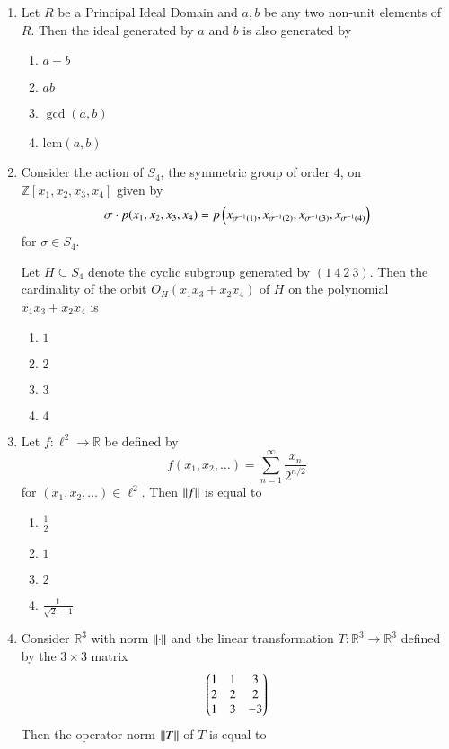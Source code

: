 \documentclass[journal,12pt,onecolumn]{IEEEtran}
\theoremstyle{remark}
\begin{document}
\begin{enumerate}
\item Let $R$ be a Principal Ideal Domain and $a,b$ be any two non-unit elements of $R$. Then the ideal generated by $a$ and $b$ is also generated by
\\[-0.3em]\makebox[\textwidth][r]{\textit{[GATE EE 2025]}}

\begin{enumerate}[label=(\Alph*)]
\item $a + b$
\item $ab$
\item $\gcd(a,b)$
\item $\mathrm{lcm}(a,b)$
\end{enumerate}

\item Consider the action of $S_4$, the symmetric group of order $4$, on $\mathbb{Z}[x_1,x_2,x_3,x_4]$ given by
\[
\sigma \cdot p(x_1,x_2,x_3,x_4) = p\left(x_{\sigma^{-1}(1)}, x_{\sigma^{-1}(2)}, x_{\sigma^{-1}(3)}, x_{\sigma^{-1}(4)}\right)
\]
for $\sigma \in S_4$.  

Let $H \subseteq S_4$ denote the cyclic subgroup generated by $(1\ 4\ 2\ 3)$. Then the cardinality of the orbit  
$O_H(x_1x_3 + x_2x_4)$ of $H$ on the polynomial $x_1x_3 + x_2x_4$ is
\\[-0.3em]\makebox[\textwidth][r]{\textit{[GATE EE 2025]}}

\begin{enumerate}[label=(\Alph*)]
\item $1$
\item $2$
\item $3$
\item $4$
\end{enumerate}

\item Let $f:\ell^2 \to \mathbb{R}$ be defined by
\[
f(x_1,x_2,\dots) = \sum_{n=1}^\infty \frac{x_n}{2^{n/2}}
\]
for $(x_1,x_2,\dots) \in \ell^2$. Then $\left\lVert f\right\rVert$ is equal to
\\[-0.3em]\makebox[\textwidth][r]{\textit{[GATE EE 2025]}}

\begin{enumerate}[label=(\Alph*)]
\item $\frac{1}{2}$
\item $1$
\item $2$
\item $\frac{1}{\sqrt{2} - 1}$
\end{enumerate}

\item Consider $\mathbb{R}^3$ with norm $\left\lVert\cdot\right\rVert$ and the linear transformation $T : \mathbb{R}^3 \to \mathbb{R}^3$ defined by the $3\times3$ matrix
\[
\begin{pmatrix}
1 & 1 & 3 \\
2 & 2 & 2 \\
1 & 3 & -3
\end{pmatrix}
\]
Then the operator norm $\left\lVert T\right\rVert$ of $T$ is equal to
\\[-0.3em]\makebox[\textwidth][r]{\textit{[GATE EE 2025]}}


\end{enumerate}
\end{document}
